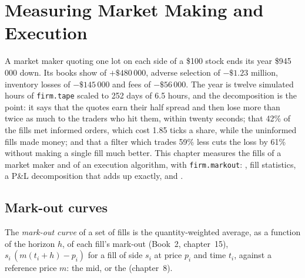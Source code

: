 \chapter{Measuring Market Making and Execution}\label{ch:rs:measuring-market-making-and-execution}

A market maker quoting one lot on each side of a \$100 stock ends its year \$945\,000 down. Its books show  of $+\$480\,000$, adverse selection
of $-\$1.23$ million, inventory losses of $-\$145\,000$ and fees of $-\$56\,000$. The year is twelve simulated hours of \texttt{firm.tape} scaled to 252 days
of 6.5 hours, and the decomposition is the point: it says that the quotes earn their half spread and then lose more than twice as much to the traders who
hit them, within twenty seconds; that 42\% of the fills met informed orders, which cost 1.85 ticks a share, while the uninformed fills made money; and that a
filter which trades 59\% less cuts the loss by 61\% without making a single fill much better. This chapter measures the fills of a market maker and of an
execution algorithm, with \texttt{firm.markout}: , fill statistics, a P\&L decomposition that adds up exactly, and .

\section{Mark-out curves}

\begin{definition}\label{def:rs:measuring-market-making-and-execution:curve}
The \emph{mark-out curve} of a set of fills is the quantity-weighted average, as a function of the horizon $h$, of each fill's mark-out
(Book~2, chapter~15), $s_i\,(m(t_i + h) - p_i)$ for a fill of side $s_i$ at price $p_i$ and time $t_i$, against a reference price $m$: the mid, or the
 (chapter~8).
\end{definition}

